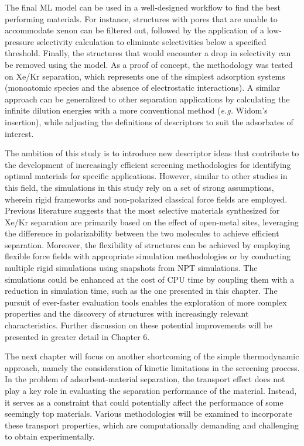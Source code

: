 \documentclass[main]{subfiles}
\begin{document}
The final ML model can be used in a well-designed workflow to find the best performing materials. For instance, structures with pores that are unable to accommodate xenon can be filtered out, followed by the application of a low-pressure selectivity calculation to eliminate selectivities below a specified threshold. Finally, the structures that would encounter a drop in selectivity can be removed using the model. As a proof of concept, the methodology was tested on Xe/Kr separation, which represents one of the simplest adsorption systems (monoatomic species and the absence of electrostatic interactions). A similar approach can be generalized to other separation applications by calculating the infinite dilution energies with a more conventional method (\emph{e.g.} Widom's insertion), while adjusting the definitions of descriptors to suit the adsorbates of interest.

The ambition of this study is to introduce new descriptor ideas that contribute to the development of increasingly efficient screening methodologies for identifying optimal materials for specific applications. However, similar to other studies in this field, the simulations in this study rely on a set of strong assumptions, wherein rigid frameworks and non-polarized classical force fields are employed. Previous literature suggests that the most selective materials synthesized for Xe/Kr separation are primarily based on the effect of open-metal sites, leveraging the difference in polarizability between the two molecules to achieve efficient separation.\autocite{Li_2019, Pei_2022} Moreover, the flexibility of structures can be achieved by employing flexible force fields with appropriate simulation methodologies\autocite{Bousquet2012} or by conducting multiple rigid simulations using snapshots from NPT simulations\autocite{Witman_2017}. The simulations could be enhanced at the cost of CPU time by coupling them with a reduction in simulation time, such as the one presented in this chapter. The pursuit of ever-faster evaluation tools enables the exploration of more complex properties and the discovery of structures with increasingly relevant characteristics. Further discussion on these potential improvements will be presented in greater detail in Chapter 6.

\vspace{1cm}

The next chapter will focus on another shortcoming of the simple thermodynamic approach, namely the consideration of kinetic limitations in the screening process. In the problem of adsorbent-material separation, the transport effect does not play a key role in evaluating the separation performance of the material. Instead, it serves as a constraint that could potentially affect the performance of some seemingly top materials. Various methodologies will be examined to incorporate these transport properties, which are computationally demanding and challenging to obtain experimentally.

\OnlyInSubfile{\printglobalbibliography}
\end{document}
